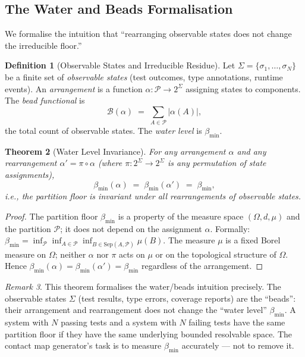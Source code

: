 \documentclass[12pt,a4paper,twocolumn]{article}
\theoremstyle{plain}
\newtheorem{theorem}{Theorem}[section]
\theoremstyle{definition}
\newtheorem{definition}[theorem]{Definition}
\theoremstyle{remark}
\newtheorem{remark}[theorem]{Remark}
\newcommand{\Part}{\mathcal{P}}
\newcommand{\Sep}{\mathrm{Sep}}
\newcommand{\bmin}{\beta_{\min}}
\newcommand{\BRS}{(\Omega,d,\mu)}
\begin{document}
\subsection{The Water and Beads Formalisation}

We formalise the intuition that ``rearranging observable states does not
change the irreducible floor.''

\begin{definition}[Observable States and Irreducible Residue]
\label{def:beads-water}
Let $\Sigma = \{\sigma_1, \ldots, \sigma_N\}$ be a finite set of
\emph{observable states} (test outcomes, type annotations, runtime events).
An \emph{arrangement} is a function $\alpha : \Part \to 2^\Sigma$ assigning
states to components.  The \emph{bead functional} is
\begin{equation}
  \mathcal{B}(\alpha) \;=\; \sum_{A \in \Part} |\alpha(A)|,
\end{equation}
the total count of observable states.  The \emph{water level} is $\bmin$.
\end{definition}

\begin{theorem}[Water Level Invariance]
\label{thm:water-beads}
For any arrangement $\alpha$ and any rearrangement $\alpha' = \pi \circ \alpha$
(where $\pi : 2^\Sigma \to 2^\Sigma$ is any permutation of state assignments),
\begin{equation}
  \bmin(\alpha) \;=\; \bmin(\alpha') \;=\; \bmin,
\end{equation}
i.e., the partition floor is invariant under all rearrangements of observable
states.
\end{theorem}

\begin{proof}
The partition floor $\bmin$ is a property of the measure space $\BRS$ and
the partition $\Part$; it does not depend on the assignment $\alpha$.
Formally: $\bmin = \inf_\Part \inf_{A \in \Part} \inf_{B \in \Sep(A,\Part)}
\mu(B)$.  The measure $\mu$ is a fixed Borel measure on $\Omega$; neither
$\alpha$ nor $\pi$ acts on $\mu$ or on the topological structure of $\Omega$.
Hence $\bmin(\alpha) = \bmin(\alpha') = \bmin$ regardless of the arrangement.
\end{proof}

\begin{remark}
This theorem formalises the water/beads intuition precisely.  The observable
states $\Sigma$ (test results, type errors, coverage reports) are the
``beads'': their arrangement and rearrangement does not change the
``water level'' $\bmin$.  A system with $N$ passing tests and a system with
$N$ failing tests have the same partition floor if they have the same
underlying bounded resolvable space.  The contact map generator's task is
to measure $\bmin$ accurately --- not to remove it.
\end{remark}
\end{document}

